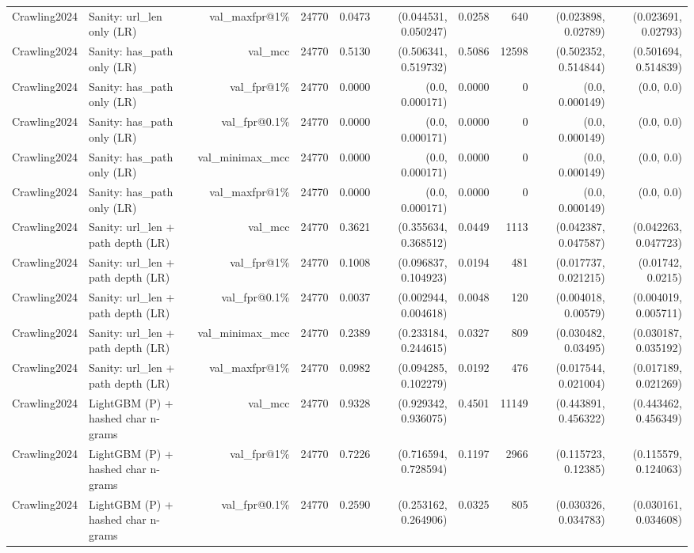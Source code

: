\begin{table}[t]
\begin{tabular}{llrrrrrrrr}
Crawling2024 & Sanity: url\_len only (LR) & val\_maxfpr@1\% & 24770 & 0.0473 & (0.044531, 0.050247) & 0.0258 & 640 & (0.023898, 0.02789) & (0.023691, 0.02793) \\
Crawling2024 & Sanity: has\_path only (LR) & val\_mcc & 24770 & 0.5130 & (0.506341, 0.519732) & 0.5086 & 12598 & (0.502352, 0.514844) & (0.501694, 0.514839) \\
Crawling2024 & Sanity: has\_path only (LR) & val\_fpr@1\% & 24770 & 0.0000 & (0.0, 0.000171) & 0.0000 & 0 & (0.0, 0.000149) & (0.0, 0.0) \\
Crawling2024 & Sanity: has\_path only (LR) & val\_fpr@0.1\% & 24770 & 0.0000 & (0.0, 0.000171) & 0.0000 & 0 & (0.0, 0.000149) & (0.0, 0.0) \\
Crawling2024 & Sanity: has\_path only (LR) & val\_minimax\_mcc & 24770 & 0.0000 & (0.0, 0.000171) & 0.0000 & 0 & (0.0, 0.000149) & (0.0, 0.0) \\
Crawling2024 & Sanity: has\_path only (LR) & val\_maxfpr@1\% & 24770 & 0.0000 & (0.0, 0.000171) & 0.0000 & 0 & (0.0, 0.000149) & (0.0, 0.0) \\
Crawling2024 & Sanity: url\_len + path depth (LR) & val\_mcc & 24770 & 0.3621 & (0.355634, 0.368512) & 0.0449 & 1113 & (0.042387, 0.047587) & (0.042263, 0.047723) \\
Crawling2024 & Sanity: url\_len + path depth (LR) & val\_fpr@1\% & 24770 & 0.1008 & (0.096837, 0.104923) & 0.0194 & 481 & (0.017737, 0.021215) & (0.01742, 0.0215) \\
Crawling2024 & Sanity: url\_len + path depth (LR) & val\_fpr@0.1\% & 24770 & 0.0037 & (0.002944, 0.004618) & 0.0048 & 120 & (0.004018, 0.00579) & (0.004019, 0.005711) \\
Crawling2024 & Sanity: url\_len + path depth (LR) & val\_minimax\_mcc & 24770 & 0.2389 & (0.233184, 0.244615) & 0.0327 & 809 & (0.030482, 0.03495) & (0.030187, 0.035192) \\
Crawling2024 & Sanity: url\_len + path depth (LR) & val\_maxfpr@1\% & 24770 & 0.0982 & (0.094285, 0.102279) & 0.0192 & 476 & (0.017544, 0.021004) & (0.017189, 0.021269) \\
Crawling2024 & LightGBM (P) + hashed char n-grams & val\_mcc & 24770 & 0.9328 & (0.929342, 0.936075) & 0.4501 & 11149 & (0.443891, 0.456322) & (0.443462, 0.456349) \\
Crawling2024 & LightGBM (P) + hashed char n-grams & val\_fpr@1\% & 24770 & 0.7226 & (0.716594, 0.728594) & 0.1197 & 2966 & (0.115723, 0.12385) & (0.115579, 0.124063) \\
Crawling2024 & LightGBM (P) + hashed char n-grams & val\_fpr@0.1\% & 24770 & 0.2590 & (0.253162, 0.264906) & 0.0325 & 805 & (0.030326, 0.034783) & (0.030161, 0.034608) \\

\end{tabular}
\end{table}
